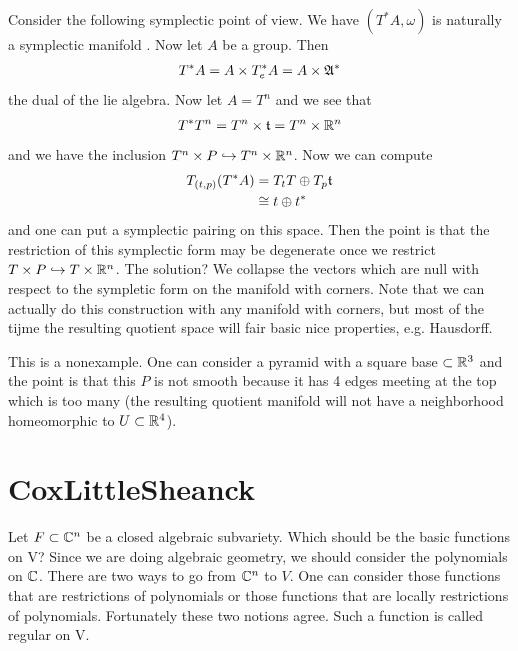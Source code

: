 \documentclass[12pt]{article}
\begin{document}
Consider the following symplectic point of view. We have $(T^*A,\omega)$ is naturally a symplectic manifold . Now let $A$ be a group. Then \begin{align*}
    T^*A = A\times T^*_eA = A \times \mathfrak{A}^*
\end{align*} the dual of the lie algebra. Now let $A = T^n$ and we see that \begin{align*}
    T^*T^n =  T^n\times\mathfrak{t} = T^n \times \mathbb{R}^n
\end{align*} and we have the inclusion $T^n\times P \hookrightarrow T^n \times \mathbb{R}^n$. Now we can compute \begin{align*}
    T_{(t,p)}(T^*A) &= T_tT\oplus T_p\mathfrak{t} \\
    &\cong t\oplus t^*
\end{align*} and one can put a symplectic pairing on this space. Then the point is that the restriction of this symplectic form may be degenerate once we restrict $T\times P \hookrightarrow T\times \mathbb{R}^n$. The solution? We collapse the vectors which are null with respect to the sympletic form on the manifold with corners. Note that we can actually do this construction with any manifold with corners, but most of the tijme the resulting quotient space will fair basic nice properties, e.g. Hausdorff.

\begin{example}
    This is a nonexample. One can consider a pyramid with a square base $\subset \mathbb{R}^3$ and the point is that this $P$ is not smooth because it has 4 edges meeting at the top which is too many (the resulting quotient manifold will not have a neighborhood homeomorphic to $U\subset\mathbb{R}^4$).
\end{example}


\section{CoxLittleSheanck}
Let $F\subset\mathbb{C}^n$ be a closed algebraic subvariety. Which should be the basic functions on V? Since we are doing algebraic geometry, we should consider the polynomials on $\mathbb{C}$. There are two ways to go from $\mathbb{C}^n$ to $V$. One can consider those functions that are restrictions of polynomials or those functions that are locally restrictions of polynomials. Fortunately these two notions agree. Such a function is called regular on V.
\end{document}
